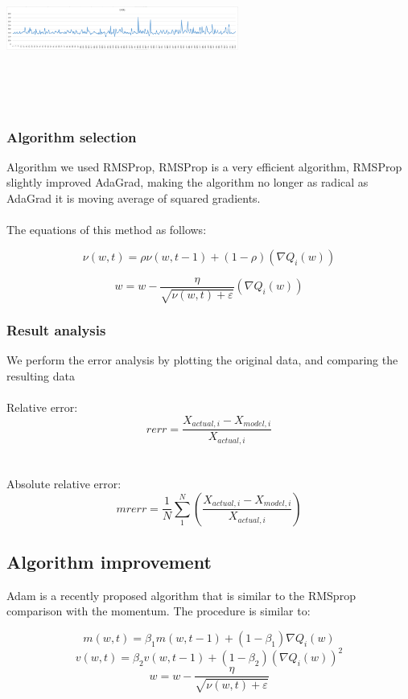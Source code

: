 \documentclass[conference,compsoc]{appendix/report}
\begin{document}
\includegraphics[width=3.00in,height=2.00in]{appendix/0406.eps}
\subsubsection{Algorithm selection}
Algorithm we used RMSProp, RMSProp is a very efficient algorithm, RMSProp slightly improved AdaGrad, making the algorithm no longer as radical as AdaGrad it is moving average of squared gradients.
\\
\\
The equations of this method as follows:

$$ \nu\left (w, t \right ) = \rho \nu\left ( w, t - 1 \right ) + \left ( 1 - \rho \right )\left ( 
\nabla{Q}_{i}(w) \right )$$

$$ w  = w - \frac{\eta }{\sqrt{\nu (w, t) + \varepsilon }} \left ( \nabla{Q}_{i}(w) \right )$$

\subsubsection{Result analysis}
We perform the error analysis by plotting the original data, and comparing the resulting data
\\
\\
Relative error:
$$ rerr = \frac{{X}_{actual, i} - {X}_{model, i}}{{X}_{actual, i}} $$
\\
\\
Absolute relative error:
$$ mrerr = \frac{1}{N} \sum_{1}^{N}\left ( \frac{{X}_{actual, i} - {X}_{model, i}}{{X}_{actual, i}} \right ) $$


\subsection{Algorithm improvement}
Adam is a recently proposed algorithm that is similar to the RMSprop comparison with the momentum. The procedure is similar to:


$$m(w,t) = {\beta}_{1} m(w, t - 1) + (1 - {\beta}_{1})\nabla{Q}_{i}(w)$$
$$v(w,t) = {\beta}_{2} v(w, t - 1) + (1 - {\beta}_{2})(\nabla{Q}_{i}(w))^{2}$$
$$w  = w - \frac{\eta }{\sqrt{\nu (w, t) + \varepsilon }}$$
\end{document}
